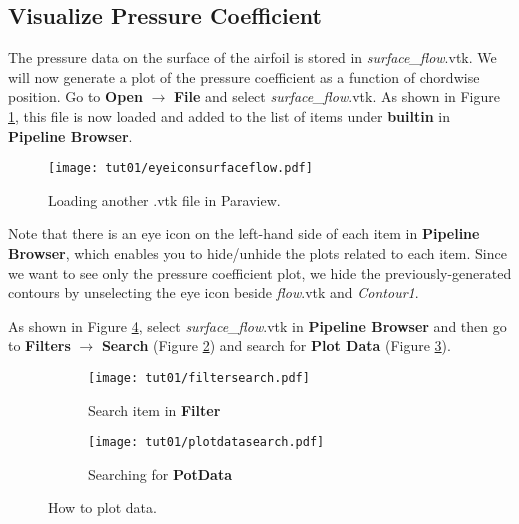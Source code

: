 \subsection{Visualize Pressure Coefficient}
The pressure data on the surface of the airfoil is stored in \textit{surface\_flow}.vtk. We will now generate a plot of the pressure coefficient as a function of chordwise position. Go to \textbf{Open} $\rightarrow$ \textbf{File} and select \textit{surface\_flow}.vtk. As shown in Figure \ref{fig1:builtin}, this file is now loaded and added to the list of items under \textbf{builtin} in \textbf{Pipeline Browser}.
\begin{figure}[htbp]
    \centering
    \texttt{[image: tut01/eyeiconsurfaceflow.pdf]}
    \caption{Loading another .vtk file in Paraview.}
    \label{fig1:builtin}
\end{figure}
Note that there is an eye icon on the left-hand side of each item in \textbf{Pipeline Browser}, which enables you to hide/unhide the plots related to each item. Since we want to see only the pressure coefficient plot, we hide the previously-generated contours by unselecting the eye icon beside \textit{flow}.vtk and \textit{Contour1}. 

As shown in Figure \ref{fig1:plotdata}, select \textit{surface\_flow}.vtk in \textbf{Pipeline Browser} and then go to \textbf{Filters} $\rightarrow$ \textbf{Search} (Figure \ref{fig1:plotdata a}) and search for \textbf{Plot Data} (Figure \ref{fig1:plotdata b}). 
\begin{figure}[htbp]
    \centering
     \begin{subfigure}[b]{.4\textwidth}
         \centering
         \texttt{[image: tut01/filtersearch.pdf]}
         \caption{Search item in \textbf{Filter}}
         \label{fig1:plotdata a}
     \end{subfigure}
     \hfill
     \begin{subfigure}[b]{.4\textwidth}
         \centering
         \texttt{[image: tut01/plotdatasearch.pdf]}
         \caption{Searching for \textbf{PotData}}
         \label{fig1:plotdata b}
     \end{subfigure}     
    \caption{How to plot data.}
    \label{fig1:plotdata}
\end{figure}

